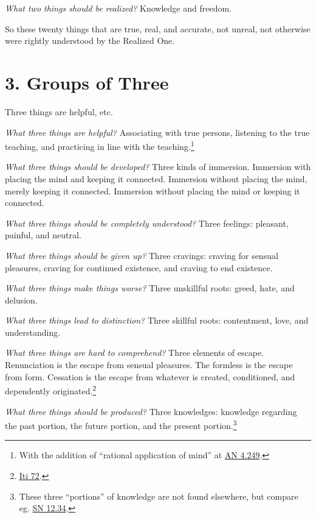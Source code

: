 \documentclass[12pt,openany]{book}%
\begin{document}
\emph{What two things should be realized?} Knowledge and freedom. 

So these twenty things that are true, real, and accurate, not unreal, not otherwise were rightly understood by the Realized One. 

\section*{3. Groups of Three }

Three things are helpful, etc. 

\emph{What three things are helpful?} Associating with true persons, listening to the true teaching, and practicing in line with the teaching.\footnote{With the addition of “rational application of mind” at \href{https://suttacentral.net/an4.249/en/sujato}{AN 4.249}. } 

\emph{What three things should be developed?} Three kinds of immersion. Immersion with placing the mind and keeping it connected. Immersion without placing the mind, merely keeping it connected. Immersion without placing the mind or keeping it connected. 

\emph{What three things should be completely understood?} Three feelings: pleasant, painful, and neutral. 

\emph{What three things should be given up?} Three cravings: craving for sensual pleasures, craving for continued existence, and craving to end existence. 

\emph{What three things make things worse?} Three unskillful roots: greed, hate, and delusion. 

\emph{What three things lead to distinction?} Three skillful roots: contentment, love, and understanding. 

\emph{What three things are hard to comprehend?} Three elements of escape. Renunciation is the escape from sensual pleasures. The formless is the escape from form. Cessation is the escape from whatever is created, conditioned, and dependently originated.\footnote{\href{https://suttacentral.net/iti72/en/sujato}{Iti 72}. } 

\emph{What three things should be produced?} Three knowledges: knowledge regarding the past portion, the future portion, and the present portion.\footnote{These three “portions” of knowledge are not found elsewhere, but compare eg. \href{https://suttacentral.net/sn12.34/en/sujato}{SN 12.34}. } 
\end{document}
